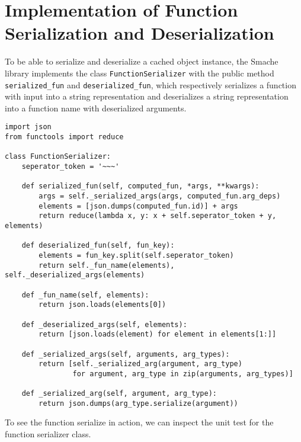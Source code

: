 \chapter{Implementation of Function Serialization and Deserialization}
\label{appendix:implementation-of-function-serialization-and-deserialization}

To be able to serialize and deserialize a cached object instance, the Smache library implements the class \verb$FunctionSerializer$ with the public method \verb$serialized_fun$ and \verb$deserialized_fun$, which respectively serializes a function with input into a string representation and deserializes a string representation into a function name with deserialized arguments.

\begin{verbatim}
import json
from functools import reduce

class FunctionSerializer:
    seperator_token = '~~~'

    def serialized_fun(self, computed_fun, *args, **kwargs):
        args = self._serialized_args(args, computed_fun.arg_deps)
        elements = [json.dumps(computed_fun.id)] + args
        return reduce(lambda x, y: x + self.seperator_token + y, elements)

    def deserialized_fun(self, fun_key):
        elements = fun_key.split(self.seperator_token)
        return self._fun_name(elements), self._deserialized_args(elements)

    def _fun_name(self, elements):
        return json.loads(elements[0])

    def _deserialized_args(self, elements):
        return [json.loads(element) for element in elements[1:]]

    def _serialized_args(self, arguments, arg_types):
        return [self._serialized_arg(argument, arg_type)
                for argument, arg_type in zip(arguments, arg_types)]

    def _serialized_arg(self, argument, arg_type):
        return json.dumps(arg_type.serialize(argument))
\end{verbatim}

To see the function serialize in action, we can inspect the unit test for the function serializer class.

